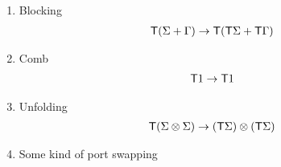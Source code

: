 \begin{definition}
\begin{enumerate}
\item Blocking
    \begin{align*}
        \mathsf T (\Sigma + \Gamma) \to \mathsf T (\mathsf T \Sigma + \mathsf T \Gamma)
    \end{align*}
    \item Comb
    \begin{align*}
        \mathsf T 1 \to \mathsf T 1
    \end{align*}
    \item Unfolding 
\begin{align*}
    \mathsf T (\Sigma \otimes \Sigma) \to (\mathsf T \Sigma) \otimes (\mathsf T \Sigma)
\end{align*}
\item Some kind of port swapping
    

    

\end{enumerate}
\end{definition}


